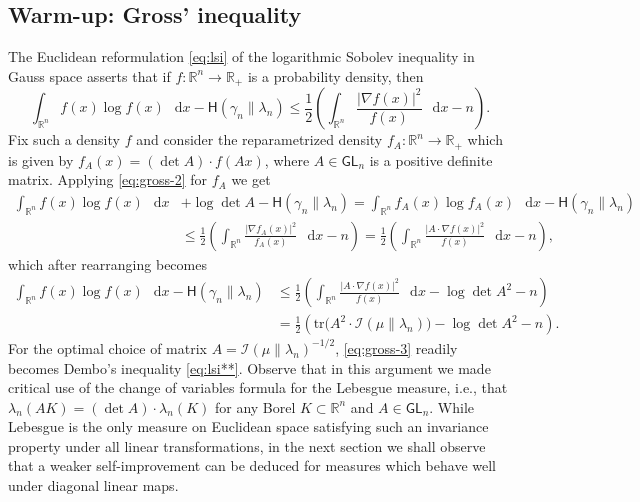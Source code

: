 \documentclass[a4paper,twoside,11pt,reqno]{amsart}
\newcommand*\diff{\mathop{}\!\mathrm{d}}
\newcommand{\R}{\mathbb{R}} %
\newcommand{\msf}{\mathsf}
\newcommand{\III}{\mathscr{I}}
\newcommand{\HH}{\mathsf{H}}
\begin{document}

\subsection{Warm-up: Gross' inequality}
The Euclidean reformulation \eqref{eq:lsi} of the logarithmic Sobolev inequality in Gauss space \cite{Gro75} asserts that if $f:\R^n\to\R_+$ is a probability density, then
\begin{equation} \label{eq:gross-2}
\int_{\R^n} f(x)\log f(x)\,\diff x - \HH(\gamma_n\|\lambda_n) \leq \frac{1}{2}\left( \int_{\R^n} \frac{|\nabla f(x)|^2}{f(x)} \,\diff x - n\right).
\end{equation}
Fix such a density $f$ and consider the reparametrized density $f_A:\R^n\to\R_+$ which is given by $f_A(x) = (\det A)\cdot f(Ax)$, where $A\in\msf{GL}_n$ is a positive definite matrix. Applying \eqref{eq:gross-2} for $f_A$ we get
\begin{equation}
\begin{split}
\int_{\R^n} f(x)\log f(x)\,\diff x & +\log\det A  - \HH(\gamma_n\|\lambda_n)=\int_{\R^n} f_A(x)\log f_A(x)\,\diff x - \HH(\gamma_n\|\lambda_n)
\\ & \leq \frac{1}{2}\left( \int_{\R^n} \frac{|\nabla f_A(x)|^2}{f_A(x)} \,\diff x - n\right) = \frac{1}{2}\left( \int_{\R^n} \frac{|A\cdot \nabla f(x)|^2}{f(x)} \,\diff x - n\right),
\end{split}
\end{equation}
which after rearranging becomes
\begin{equation} \label{eq:gross-3}
\begin{split}
\int_{\R^n} f(x)\log f(x)\,\diff x  - \HH(\gamma_n\|\lambda_n)& \leq \frac{1}{2}\left( \int_{\R^n} \frac{|A\cdot \nabla f(x)|^2}{f(x)} \,\diff x -\log\det A^2 - n\right)
\\ & =  \frac{1}{2}\left( \mathrm{tr} \big( A^2\cdot \III(\mu\|\lambda_n)\big) -\log\det A^2 - n\right).
\end{split}
\end{equation}
For the optimal choice of matrix $A=\III(\mu\|\lambda_n)^{-1/2}$, \eqref{eq:gross-3} readily becomes Dembo's inequality \eqref{eq:lsi**}. Observe that in this argument we made critical use of the change of variables formula for the Lebesgue measure, i.e., that $\lambda_n(AK) = (\det A)\cdot \lambda_n(K)$ for any Borel $K\subset\R^n$ and $A\in\msf{GL}_n$. While Lebesgue is the only measure on Euclidean space satisfying such an invariance property under all linear transformations, in the next section we shall observe that a weaker self-improvement can be deduced for measures which behave well under diagonal linear maps.
\end{document}
